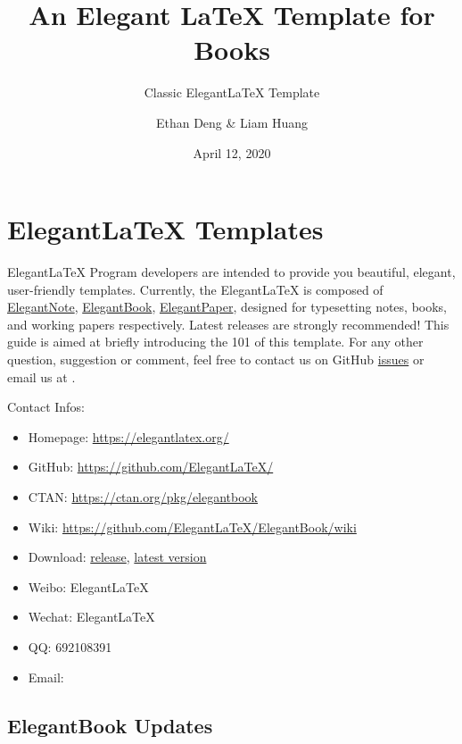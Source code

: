 \documentclass[11pt,fancy,authoryear]{elegantbook}
\title{An Elegant \LaTeX{} Template for Books}
\subtitle{Classic Elegant\LaTeX{} Template}
\author{Ethan Deng \& Liam Huang}
\institute{Elegant\LaTeX{} Program}
\date{April 12, 2020}
\begin{document}
\maketitle

\frontmatter
\tableofcontents

\mainmatter
\chapter{Elegant\LaTeX{} Templates}
Elegant\LaTeX{} Program developers are intended to provide you beautiful, elegant, user-friendly templates. Currently, the Elegant\LaTeX{} is composed of \href{https://github.com/ElegantLaTeX/ElegantNote}{ElegantNote}, \href{https://github.com/ElegantLaTeX/ElegantBook}{ElegantBook}, \href{https://github.com/ElegantLaTeX/ElegantPaper}{ElegantPaper}, designed for typesetting notes, books, and working papers respectively. Latest releases are strongly recommended! This guide is aimed at briefly introducing the 101 of this template. For any other question, suggestion or comment, feel free to contact us on GitHub \href{https://github.com/ElegantLaTeX/ElegantBook/issues}{issues} or email us at .

Contact Infos:
\begin{itemize}
  \item Homepage: \href{https://elegantlatex.org/}{https://elegantlatex.org/}
  \item GitHub: \href{https://github.com/ElegantLaTeX/}{https://github.com/ElegantLaTeX/}
  \item CTAN: \href{https://ctan.org/pkg/elegantbook}{https://ctan.org/pkg/elegantbook}
  \item Wiki: \href{https://github.com/ElegantLaTeX/ElegantBook/wiki}{https://github.com/ElegantLaTeX/ElegantBook/wiki}
  \item Download: \href{https://github.com/ElegantLaTeX/ElegantBook/releases}{release}, \href{https://github.com/ElegantLaTeX/ElegantBook/archive/master.zip}{latest version}
  \item Weibo: Elegant\LaTeX{}
  \item Wechat: Elegant\LaTeX{}
  \item QQ: 692108391
  \item Email: 
\end{itemize}


\section{ElegantBook Updates}
\end{document}
